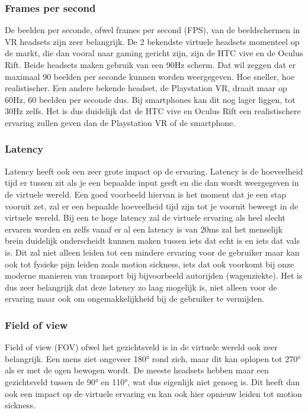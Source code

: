 \subsubsection{Frames per second}
\label{ssubsec:fps}
De beelden per seconde, ofwel frames per second (FPS), van de beeldschermen in VR headsets zijn zeer belangrijk. De 2 bekendste virtuele headsets momenteel op de markt, die dan vooral naar gaming gericht zijn, zijn de HTC vive en de Oculus Rift. Beide headsets maken gebruik van een 90Hz scherm. Dat wil zeggen dat er maximaal 90 beelden per seconde kunnen worden weergegeven. Hoe sneller, hoe realistischer. Een andere bekende headset, de Playstation VR, draait maar op 60Hz, 60 beelden per seconde dus. Bij smartphones kan dit nog lager liggen, tot 30Hz zelfs. Het is dus duidelijk dat de HTC vive en Oculus Rift een realistischere ervaring zullen geven dan de Playstation VR of de smartphone.

\subsubsection{Latency}
\label{ssubsec:latency}
Latency heeft ook een zeer grote impact op de ervaring. Latency is de hoeveelheid tijd er tussen zit als je een bepaalde input geeft en die dan wordt weergegeven in de virtuele wereld. Een goed voorbeeld hiervan is het moment dat je een stap vooruit zet, zal er een bepaalde hoeveelheid tijd zijn tot je vooruit beweegt in de virtuele wereld. Bij een te hoge latency zal de virtuele ervaring als heel slecht ervaren worden en zelfs vanaf er al een latency is van 20ms zal het menselijk brein duidelijk onderscheidt kunnen maken tussen iets dat echt is en iets dat vals is. Dit zal niet alleen leiden tot een mindere ervaring voor de gebruiker maar kan ook tot fysieke pijn leiden zoals motion sickness, iets dat ook voorkomt bij onze moderne manieren van transport bij bijvoorbeeld autorijden (wagenziekte). Het is dus zeer belangrijk dat deze latency zo laag mogelijk is, niet alleen voor de ervaring maar ook om ongemakkelijkheid bij de gebruiker te vermijden.

\subsubsection{Field of view}
\label{ssubsec:fov}
Field of view (FOV) ofwel het gezichtsveld is in de virtuele wereld ook zeer belangrijk. Een mens ziet ongeveer 180° rond zich, maar dit kan oplopen tot 270° als er met de ogen bewogen wordt. De meeste headsets hebben maar een gezichtsveld tussen de 90° en 110°, wat dus eigenlijk niet genoeg is. Dit heeft dan ook een impact op de virtuele ervaring en kan ook hier opnieuw leiden tot motion sickness.

